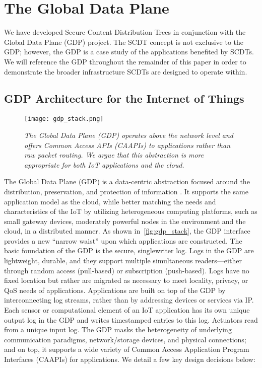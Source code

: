 \chapter{The Global Data Plane}
\label{gdp}

We have developed Secure Content Distribution Trees in conjunction with the Global Data Plane (GDP) project. The SCDT concept is not exclusive to the GDP; however, the GDP is a case study of the applications benefited by SCDTs. We will reference the GDP throughout the remainder of this paper in order to demonstrate the broader  infrastructure SCDTs are designed to operate within.

\section{GDP Architecture for the Internet of Things}
\label{gdp-arch}
\begin{figure}[t]
	\begin{center}
		\texttt{[image: gdp\_stack.png]}
	\end{center}
	\vspace{-1.3em}
	\caption{\small \itshape  The Global Data Plane (GDP) operates above the network level and offers Common Access APIs (CAAPIs) to applications rather than raw packet routing. We argue that this abstraction is more appropriate for both IoT applications and the cloud.}
	\vspace{-1em}
	\label{fig:gdp_stack}
\end{figure}

The Global Data Plane (GDP) is a data-centric abstraction
focused around the distribution, preservation, and
protection of information \cite{kubi}. It supports the same application
model as the cloud, while better matching the needs
and characteristics of the IoT by utilizing heterogeneous
computing platforms, such as small gateway devices, moderately
powerful nodes in the environment and the cloud,
in a distributed manner.
As shown in~\autoref{fig:gdp_stack}, the GDP interface provides a new
“narrow waist” upon which applications are constructed.
The basic foundation of the GDP is the secure, singlewriter
log. Logs in the GDP are lightweight, durable,
and they support multiple simultaneous readers—either
through random access (pull-based) or subscription (push-based).
Logs have no fixed location but rather are migrated
as necessary to meet locality, privacy, or QoS needs
of applications.
Applications are built on top of the GDP by interconnecting
log streams, rather than by addressing devices or
services via IP. Each sensor or computational element of
an IoT application has its own unique output log in the
GDP and writes timestamped entries to this log. Actuators
read from a unique input log. The GDP masks the
heterogeneity of underlying communication paradigms,
network/storage devices, and physical connections; and
on top, it supports a wide variety of Common Access Application
Program Interfaces (CAAPIs) for applications.
We detail a few key design decisions below:


